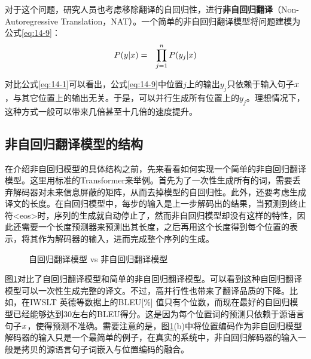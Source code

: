 \parinterval 对于这个问题，研究人员也考虑移除翻译的自回归性，进行{\small\sffamily\bfseries{非自回归翻译}}（Non-Autoregressive Translation，NAT）。一个简单的非自回归翻译模型将问题建模为公式\eqref{eq:14-9}：
\begin{eqnarray}
{P}({y}|{x}) &=& \prod_{j=1}^n {{P}(y_j|{x})}
\label{eq:14-9}
\end{eqnarray}

\parinterval 对比公式\eqref{eq:14-1}可以看出，公式\eqref{eq:14-9}中位置$j$上的输出$y_j$只依赖于输入句子${x}$，与其它位置上的输出无关。于是，可以并行生成所有位置上的${y_j}$。理想情况下，这种方式一般可以带来几倍甚至十几倍的速度提升。


\subsection{非自回归翻译模型的结构}

\parinterval 在介绍非自回归模型的具体结构之前，先来看看如何实现一个简单的非自回归翻译模型。这里用标准的Transformer来举例。首先为了一次性生成所有的词，需要丢弃解码器对未来信息屏蔽的矩阵，从而去掉模型的自回归性。此外，还要考虑生成译文的长度。在自回归模型中，每步的输入是上一步解码出的结果，当预测到终止符<eos>时，序列的生成就自动停止了，然而非自回归模型却没有这样的特性，因此还需要一个长度预测器来预测出其长度，之后再用这个长度得到每个位置的表示，将其作为解码器的输入，进而完成整个序列的生成。

\begin{figure}[htp]
\centering
 
\caption{自回归翻译模型 vs 非自回归翻译模型}
\label{fig:14-12}
\end{figure}

\parinterval 图\ref{fig:14-12}对比了自回归翻译模型和简单的非自回归翻译模型。可以看到这种自回归翻译模型可以一次性生成完整的译文。不过，高并行性也带来了翻译品质的下降。比如，在IWSLT 英德等数据上的BLEU[\%] 值只有个位数，而现在最好的自回归模型已经能够达到30左右的BLEU得分。这是因为每个位置词的预测只依赖于源语言句子${x}$，使得预测不准确。需要注意的是，图\ref{fig:14-12}(b)中将位置编码作为非自回归模型解码器的输入只是一个最简单的例子，在真实的系统中，非自回归解码器的输入一般是拷贝的源语言句子词嵌入与位置编码的融合。



